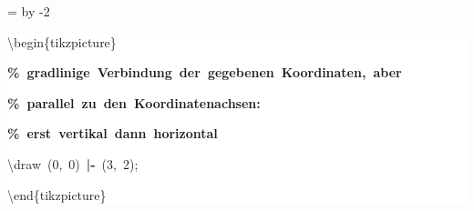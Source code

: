\begingroup
\ttfamily
{}
=\textwidth
\advance{} by -2\fboxsep
\noindent
\colorbox{background}
{%
\parbox{\dimen255}
{%
\rule[-0.5ex]{0pt}{2.5ex}\hspace*{0.0em}\textbackslash{}begin\{tikzpicture\}\\
\rule[-0.5ex]{0pt}{2.5ex}\hspace*{1.0em}\textcolor{G}{\textbf{\%~gradlinige~Verbindung~der~gegebenen~Koordinaten,~aber}}\\
\rule[-0.5ex]{0pt}{2.5ex}\hspace*{1.0em}\textcolor{G}{\textbf{\%~parallel~zu~den~Koordinatenachsen:}}\\
\rule[-0.5ex]{0pt}{2.5ex}\hspace*{1.0em}\textcolor{G}{\textbf{\%~erst~vertikal~dann~horizontal}}\\
\rule[-0.5ex]{0pt}{2.5ex}\hspace*{1.0em}\textbackslash{}draw~(0,~0)~\textcolor{R}{\textbf{|{-}}}~(3,~2);\\
\rule[-0.5ex]{0pt}{2.5ex}\hspace*{0.0em}\textbackslash{}end\{tikzpicture\}}%
}%
\endgroup
